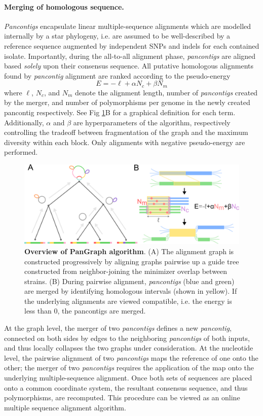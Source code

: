 \documentclass[aps,rmp,reprint,superscriptaddress,notitlepage,10pt]{revtex4-1}
\begin{document}
\paragraph{Merging of homologous sequence.}
\emph{Pancontigs} encapsulate linear multiple-sequence alignments which are modelled internally by a star phylogeny, i.e. are assumed to be well-described by a reference sequence augmented by independent SNPs and indels for each contained isolate.
Importantly, during the all-to-all alignment phase, \emph{pancontigs} are aligned based \emph{solely} upon their consensus sequence.
All putative homologous alignments found by \emph{pancontig} alignment are ranked according to the pseudo-energy
\begin{equation}
    E = -\ell + \alpha N_c + \beta N_m
\end{equation}
where $\ell$, $N_c$, and $N_m$ denote the alignment length, number of \emph{pancontigs} created by the merger, and number of polymorphisms per genome in the newly created {pancontig} respectively.
See Fig \ref{fig:visualization}B for a graphical definition for each term.
Additionally, $\alpha$ and $\beta$ are hyperparameters of the algorithm, respectively controlling the tradeoff between fragmentation of the graph and the maximum diversity within each block.
Only alignments with negative pseudo-energy are performed.

\begin{figure}[htb]
    \includegraphics[width=.5\textwidth]{algorithm.png}
    \caption{{\bf Overview of PanGraph algorithm}.
    (A) The alignment graph is constructed progressively by aligning graphs pairwise up a guide tree constructed from neighbor-joining the minimizer overlap between strains. 
    (B) During pairwise alignment, \emph{pancontigs} (blue and green)
    are merged by identifying homologous intervals (shown in yellow).
    If the underlying alignments are viewed compatible, i.e. the energy is less than 0, the pancontigs are merged.
    }
    \label{fig:visualization}
\end{figure}

At the graph level, the merger of two \emph{pancontigs} defines a new \emph{pancontig}, connected on both sides by edges to the neighboring \emph{pancontigs} of both inputs, and thus locally collapses the two graphs under consideration.
At the nucleotide level, the pairwise alignment of two \emph{pancontigs} maps the reference of one onto the other; the merger of two \emph{pancontigs} requires the application of the map onto the underlying multiple-sequence alignment.
Once both sets of sequences are placed onto a common coordinate system, the resultant consensus sequence, and thus polymorphisms, are recomputed.
This procedure can be viewed as an online multiple sequence alignment algorithm.
\end{document}
